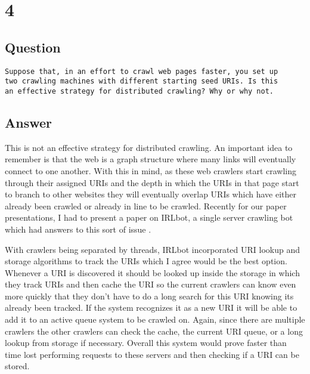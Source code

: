 \documentclass[letterpaper,11pt]{article}
\newcommand*{\srcPath}{../src}%
\begin{document}
 

\clearpage


\section*{4}

\subsection*{Question}

\begin{verbatim}
Suppose that, in an effort to crawl web pages faster, you set up
two crawling machines with different starting seed URIs. Is this
an effective strategy for distributed crawling? Why or why not.
\end{verbatim}

\subsection*{Answer}

This is not an effective strategy for distributed crawling.
An important idea to remember is that the web is a graph structure where many links will eventually connect to one another.
With this in mind, as these web crawlers start crawling through their assigned URIs and the depth in which the URIs in that page start to branch to other websites they will eventually overlap URIs which have either already been crawled or already in line to be crawled.
Recently for our paper presentations, I had to present a paper on IRLbot, a single server crawling bot which had answers to this sort of issue \cite{irlbot}.

With crawlers being separated by threads, IRLbot incorporated URI lookup and storage algorithms to track the URIs which I agree would be the best option.
Whenever a URI is discovered it should be looked up inside the storage in which they track URIs and then cache the URI so the current crawlers can know even more quickly that they don't have to do a long search for this URI knowing its already been tracked.
If the system recognizes it as a new URI it will be able to add it to an active queue system to be crawled on.
Again, since there are multiple crawlers the other crawlers can check the cache, the current URI queue, or a long lookup from storage if necessary.
Overall this system would prove faster than time lost performing requests to these servers and then checking if a URI can be stored.
\end{document}
